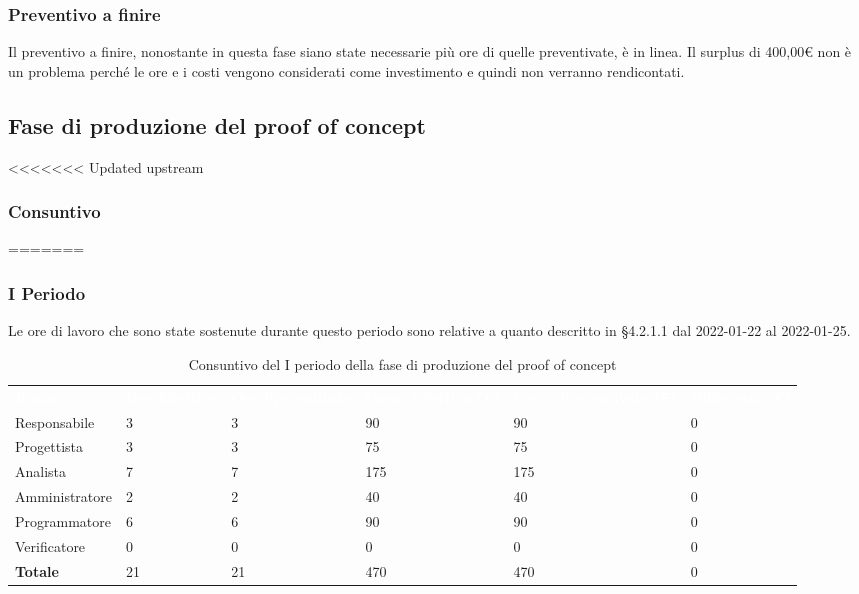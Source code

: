 \subsubsection{Preventivo a finire}
Il preventivo a finire,  nonostante in questa fase siano state necessarie più ore di quelle preventivate,  è in linea.  Il surplus di 400,00\euro \xspace non è un problema perché le ore e i costi vengono considerati come investimento e quindi non verranno rendicontati.


\pagebreak


\subsection{Fase di produzione del proof of concept}
<<<<<<< Updated upstream
\subsubsection{Consuntivo}
=======

\subsubsection{I Periodo}
Le ore di lavoro che sono state sostenute durante questo periodo sono relative a quanto descritto in §4.2.1.1 dal 2022-01-22 al 2022-01-25.

\begin{table}[!htbp]
\begin{center}
\renewcommand{\arraystretch}{1.5}
\begin{tabular}{ m{}<{\centering}  m{}<{\centering} m{}<{\centering} m{}<{\centering} m{}<{\centering} m{}<{\centering}}
	\rowcolor{darkblue}
	\textcolor{white}{\textbf{Ruolo}} & \textcolor{white}{\textbf{Ore Effettive}} & \textcolor{white}{\textbf{Ore Preventivate}}&\textcolor{white}{\textbf{Costo Effettivo (\euro) }}&\textcolor{white}{\textbf{Costo Preventivato (\euro)}}&\textcolor{white}{\textbf{Differenza (\euro)}}\\ 
	
	Responsabile  & 3 & 3 & 90 & 90 & 0 \\	
	
	Progettista & 3 & 3 & 75 & 75 & 0 \\
	
	Analista & 7 & 7 & 175 & 175 & 0 \\

	Amministratore & 2 & 2 & 40 & 40 & 0 \\
	
	Programmatore & 6 & 6 & 90 & 90 &  0 \\
	
	Verificatore & 0 & 0 & 0 & 0 & 0 \\
	
	\textbf{Totale} & 21 & 21 & 470 & 470 & 0 \\
	
\end{tabular}
\caption{Consuntivo del I periodo della fase di produzione del proof of concept}
\end{center}
\end{table}


